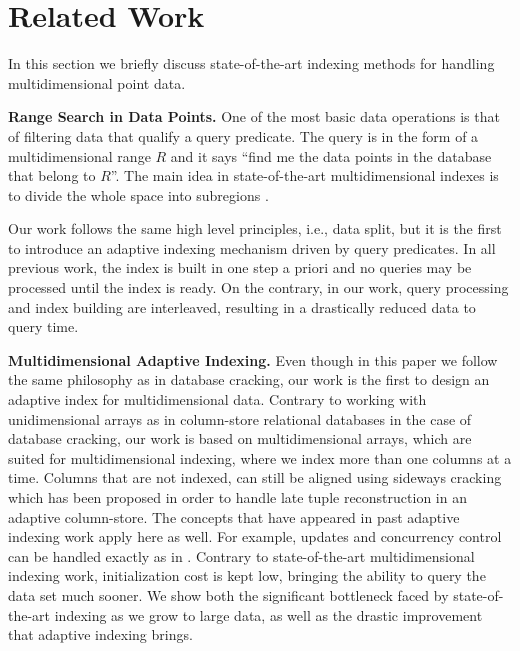 \section{Related Work}
\label{sec:related_work}

In this section we briefly discuss state-of-the-art indexing methods for handling multidimensional point data.

\textbf{Range Search in Data Points.}
One of the most basic data operations is that of filtering data that qualify a query predicate.
The query is in the form of a multidimensional range $R$ and it says ``find me the data points in the database that belong to $R$''.
The main idea in state-of-the-art multidimensional indexes is to divide the whole space into subregions \cite{Samet:book}.

 
Our work follows the same high level principles, i.e., data split, but it is the first to introduce  an adaptive indexing mechanism driven by query predicates.  
In all previous work, the index is built in one step a priori and no queries may be processed until the index is ready. 
On the contrary, in our work, query processing and index building are interleaved, resulting in a drastically reduced data to query time.






\textbf{Multidimensional Adaptive Indexing.} Even though in this paper we follow the same philosophy as in database cracking, our work is the first to design an adaptive index for multidimensional data.%
Contrary to working with unidimensional arrays as in column-store relational databases in the case of database cracking, our work is based on multidimensional arrays,  which are suited for multidimensional indexing, where we index more than one columns at a time.  
Columns that are not indexed, can still be aligned using sideways cracking \cite{DBLP:conf/sigmod/IdreosKM09} which has been proposed in order to handle late tuple reconstruction in an adaptive column-store.
The concepts that have appeared in past adaptive indexing work apply here as well.
For example, updates and concurrency control can be handled exactly as in \cite{DBLP:journals/pvldb/GraefeHIKM12, CrackingTransactions, DBLP:conf/sigmod/IdreosKM07}.
Contrary to state-of-the-art multidimensional indexing work, initialization cost is kept low, bringing the ability to query the data set much sooner.   
We show both the significant bottleneck faced by state-of-the-art indexing as we grow to large data,
as well as the drastic improvement that adaptive indexing brings.
